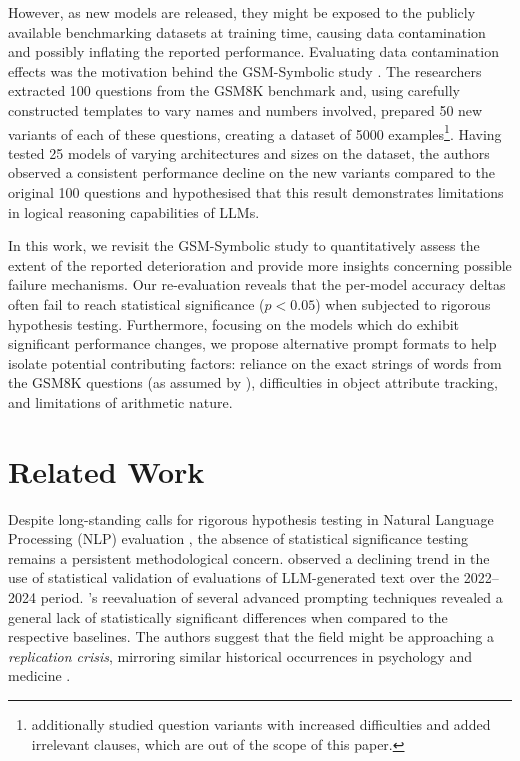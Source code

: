 \documentclass[11pt]{article}
\begin{document}
However, as new models are released, they might be exposed to the publicly available benchmarking datasets at training time, causing data contamination and possibly inflating the reported performance. Evaluating data contamination effects was the motivation behind the GSM-Symbolic study \citep{mirzadeh2025gsm}. The researchers extracted 100 questions from the GSM8K benchmark and, using carefully constructed templates to vary names and numbers involved, prepared 50 new variants of each of these questions, creating a dataset of 5000 examples\footnote{\citeauthor{mirzadeh2025gsm} additionally studied question variants with increased difficulties and added irrelevant clauses, which are out of the scope of this paper.}. Having tested 25 models of varying architectures and sizes on the dataset, the authors observed a consistent performance decline on the new variants compared to the original 100 questions and hypothesised that this result demonstrates limitations in logical reasoning capabilities of LLMs.%

In this work, we revisit the GSM-Symbolic study to quantitatively assess the extent of the reported deterioration and provide more insights concerning possible failure mechanisms.
Our re-evaluation reveals that the per-model accuracy deltas often fail to reach statistical significance ($p < 0.05$) when subjected to rigorous hypothesis testing.
Furthermore, focusing on the models which do exhibit significant performance changes, we propose alternative prompt formats to help isolate potential contributing factors: reliance on the exact strings of words from the GSM8K questions (as assumed by \citeauthor{mirzadeh2025gsm}), difficulties in object attribute tracking, and limitations of arithmetic nature.


\section{Related Work}
Despite long-standing calls for rigorous hypothesis testing in Natural Language Processing (NLP) evaluation \citep{marie2021scientific,dror-etal-2018-hitchhikers}, the absence of statistical significance testing remains a persistent methodological concern. 
\citet{Arias_Blocher_Rodemann_Assenmacher_Jansen_2025} observed a declining trend in the use of statistical validation of evaluations of LLM-generated text over the 2022--2024 period.
\citet{vaugrante2024loomingreplicationcrisisevaluating}'s reevaluation of several advanced prompting techniques revealed a general lack of statistically significant differences when compared to the respective baselines. The authors suggest that the field might be approaching a \textit{replication crisis}, mirroring similar historical occurrences in psychology \citep{Simmons_Nelson_Simonsohn_2011, estimating2015} and medicine \citep{ioannidis2005most, Begley_Ellis_2012}.
\end{document}
